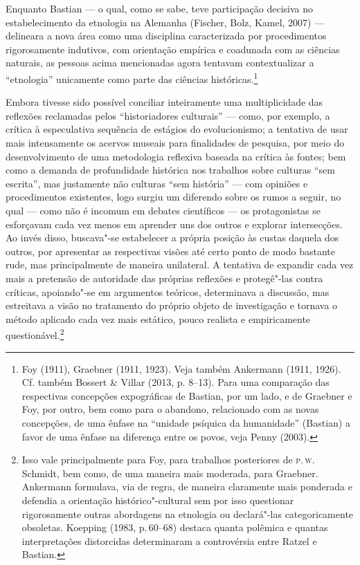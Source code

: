 Enquanto Bastian --- o qual, como se sabe, teve participação decisiva no
estabelecimento da etnologia na Alemanha (Fischer, Bolz, Kamel, 2007) ---
delineara a nova área como uma disciplina caracterizada por
procedimentos rigorosamente indutivos, com orientação empírica e
coadunada com as ciências naturais, as pessoas acima mencionadas agora
tentavam contextualizar a ``etnologia'' unicamente como parte das
ciências históricas.\footnote{Foy (1911), Graebner (1911, 1923). Veja
  também Ankermann (1911, 1926). Cf. também Bossert \& Villar (2013, p.
  8--13). Para uma comparação das respectivas concepções expográficas de
  Bastian, por um lado, e de Graebner e Foy, por outro, bem como para o
  abandono, relacionado com as novas concepções, de uma ênfase na
  ``unidade psíquica da humanidade'' (Bastian) a favor de uma ênfase na
  diferença entre os povos, veja Penny (2003).}

Embora tivesse sido possível conciliar inteiramente uma multiplicidade
das reflexões reclamadas pelos ``historiadores culturais'' --- como, por
exemplo, a crítica à especulativa sequência de estágios do
evolucionismo; a tentativa de usar mais intensamente os acervos museais
para finalidades de pesquisa, por meio do desenvolvimento de uma
metodologia reflexiva baseada na crítica às fontes; bem como a demanda
de profundidade histórica nos trabalhos sobre culturas ``sem escrita'',
mas justamente não culturas ``sem história'' --- com opiniões e
procedimentos existentes, logo surgiu um diferendo sobre os rumos a
seguir, no qual --- como não é incomum em debates científicos --- os
protagonistas se esforçavam cada vez menos em aprender uns dos outros e
explorar intersecções. Ao invés disso, buscava"-se estabelecer a própria
posição às custas daquela dos outros, por apresentar as respectivas
visões até certo ponto de modo bastante rude, mas principalmente de
maneira unilateral. A tentativa de expandir cada vez mais a pretensão
de autoridade das próprias reflexões e protegê"-las contra críticas,
apoiando"-se em argumentos teóricos, determinava a discussão, mas
estreitava a visão no tratamento do próprio objeto de investigação e
tornava o método aplicado cada vez mais estático, pouco realista e
empiricamente questionável.\footnote{Isso vale principalmente para Foy,
  para trabalhos posteriores de \textsc{p}.\,\textsc{w}. Schmidt, bem como, de uma maneira
  mais moderada, para Graebner. Ankermann formulava, via de regra, de
  maneira claramente mais ponderada e defendia a orientação
  histórico"-cultural sem por isso questionar rigorosamente outras
  abordagens na etnologia ou declará"-las categoricamente obsoletas.
  Koepping (1983, p.\,60--68) destaca quanta polêmica e quantas
  interpretações distorcidas determinaram a controvérsia entre Ratzel e
  Bastian.}

